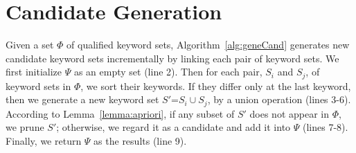 \section{Candidate Generation}
\label{app:geneCand}

Given a set $\Phi$ of qualified keyword sets,
Algorithm~\ref{alg:geneCand} generates new candidate keyword sets incrementally
by linking each pair of keyword sets.
We first initialize $\Psi$ as an empty set (line 2).
Then for each pair, $S_i$ and $S_j$, of keyword sets in $\Phi$,
we sort their keywords.
If they differ only at the last keyword,
then we generate a new keyword set $S'$=$S_i\cup S_j$,
by a union operation (lines 3-6).
According to Lemma~\ref{lemma:apriori},
if any subset of $S'$ does not appear in $\Phi$, we prune $S'$;
otherwise, we regard it as a candidate and add it into $\Psi$ (lines 7-8).
Finally, we return $\Psi$ as the results (line 9).

